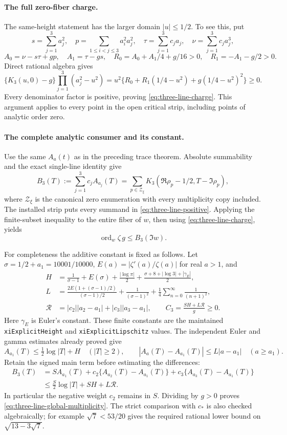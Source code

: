 \paragraph{The full zero-fiber charge.}
The same-height statement has the larger domain \(|u|\le1/2\).
To see this, put
\[
 s=\sum_{j=1}^3a_j^2,\quad
 p=\sum_{1\le i<j\le3}a_i^2a_j^2,\quad
 \tau=\sum_{j=1}^3c_ja_j,\quad
 \nu=\sum_{j=1}^3c_ja_j^3,
\]
\[
 A_0=\nu-s\tau+gp,\quad A_1=\tau-gs,\quad
 R_0=A_0+A_1/4+g/16>0,\quad R_1=-A_1-g/2>0.
\]
Direct rational algebra gives
\[
 \{K_3(u,0)-g\}\prod_{j=1}^3(a_j^2-u^2)
   =u^2\{R_0+R_1(1/4-u^2)+g(1/4-u^2)^2\}\ge0.
\]
Every denominator factor is positive, proving
\eqref{eq:three-line-charge}. This argument applies to every point
in the open critical strip, including points of analytic order zero.

\paragraph{The complete analytic consumer and its constant.}
Use the same \(A_a(t)\) as in the preceding trace theorem. Absolute
summability and the exact single-line identity give
\[
 B_3(T):=\sum_{j=1}^3c_jA_{a_j}(T)
 =\sum_{p\in\mathcal Z_\xi}
 K_3(\Re\rho_p-1/2,T-\Im\rho_p),
\]
where \(\mathcal Z_\xi\) is the canonical zero enumeration with every
multiplicity copy included. The installed strip puts every summand in
\eqref{eq:three-line-positive}. Applying the finite-subset inequality
to the entire fiber of \(w\), then using
\eqref{eq:three-line-charge}, yields
\[
                  \operatorname{ord}_w\zeta\,g\le B_3(\Im w).
\]

For completeness the additive constant is fixed as follows. Let
\(\sigma=1/2+a_1=10001/10000\),
\(E(a)=|\zeta'(a)/\zeta(a)|\) for real \(a>1\), and
\begin{align*}
 H&=\frac1{\sigma-1}+E(\sigma)+\frac{|\log\pi|}{2}
       +\frac{\sigma+8+|\log3|+|\gamma_E|}{2},\\
 L&=\frac{2E(1+(\sigma-1)/2)}{(\sigma-1)/2}
       +\frac1{(\sigma-1)^2}
       +\frac14\sum_{n=0}^{\infty}\frac1{(n+1)^2},\\
 \mathcal R&=|c_2||a_2-a_1|+|c_3||a_3-a_1|,
       \qquad C_3=\frac{SH+L\mathcal R}{g}\ge0.
\end{align*}
Here \(\gamma_E\) is Euler's constant. These finite constants are the
maintained \texttt{xiExplicitHeight} and \texttt{xiExplicitLipschitz}
values. The independent Euler and gamma estimates already proved give
\[
 A_{a_1}(T)\le\tfrac12\log|T|+H\quad(|T|\ge2),\qquad
 |A_a(T)-A_{a_1}(T)|\le L|a-a_1|\quad(a\ge a_1).
\]
Retain the signed main term before estimating the differences:
\begin{align*}
 B_3(T)&=S A_{a_1}(T)
       +c_2\{A_{a_2}(T)-A_{a_1}(T)\}
       +c_3\{A_{a_3}(T)-A_{a_1}(T)\}\\
 &\le \frac S2\log|T|+SH+L\mathcal R.
\end{align*}
In particular the negative weight \(c_2\) remains in \(S\).
Dividing by \(g>0\) proves
\eqref{eq:three-line-global-multiplicity}. The strict comparison with
\(c_*\) is also checked algebraically; for example
\(\sqrt7<53/20\) gives the required rational lower bound on
\(\sqrt{13-3\sqrt7}\).

